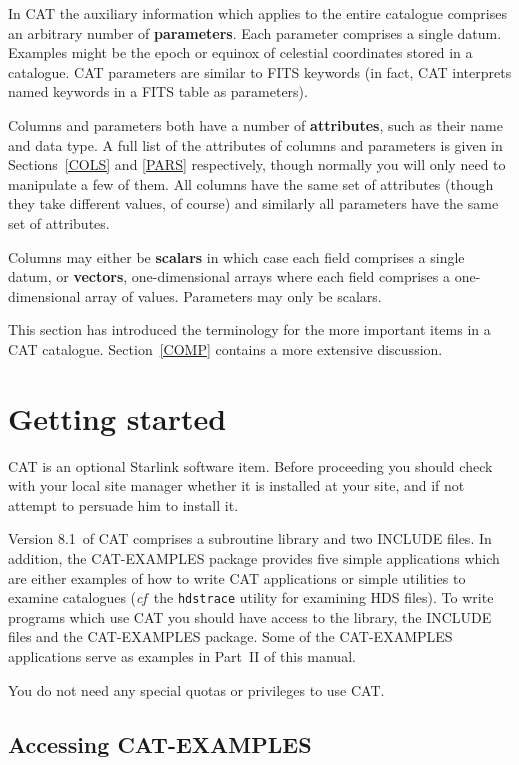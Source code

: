 \documentclass[11pt,twoside]{starlink}
\providecommand{\CATversion}{8.1~}
\begin{document}
In CAT the auxiliary information which applies to the entire catalogue
comprises an arbitrary number of \textbf{parameters}. Each parameter
comprises a single datum. Examples might be the epoch or equinox of
celestial coordinates stored in a catalogue. CAT parameters are
similar to FITS keywords (in fact, CAT interprets named keywords in
a FITS table as parameters).

Columns and parameters both have a number of \textbf{attributes}, such
as their name and data type. A full list of the attributes of
columns and parameters is given in Sections~\ref{COLS} and
\ref{PARS} respectively, though normally you will only need to
manipulate a few of them.  All columns have the same set of attributes
(though they take different values, of course) and similarly all
parameters have the same set of attributes.

Columns may either be \textbf{scalars} in which case each field comprises
a single datum, or \textbf{vectors}, one-dimensional arrays where each
field comprises a one-dimensional array of values. Parameters may only
be scalars.

This section has introduced the terminology for the more important
items in a CAT catalogue. Section~\ref{COMP} contains a more extensive
discussion.


\section{\label{START}Getting started}

CAT is an optional Starlink software item. Before proceeding you should
check with your local site manager whether it is installed at your site,
and if not attempt to persuade him to install it.

Version \CATversion of CAT comprises a subroutine library and two INCLUDE
files.  In addition, the CAT-EXAMPLES package provides five simple
applications which are either examples of how to write CAT applications
or simple utilities to examine catalogues (\textit{cf}\, the \texttt{hdstrace}
utility for examining HDS files). To write programs which use CAT you
should have access to the library, the INCLUDE files and the CAT-EXAMPLES
package.  Some of the CAT-EXAMPLES applications serve as examples in
Part~II of this manual.

You do not need any special quotas or privileges to use CAT.


\subsection{\label{ACCESS}Accessing CAT-EXAMPLES}
\end{document}

